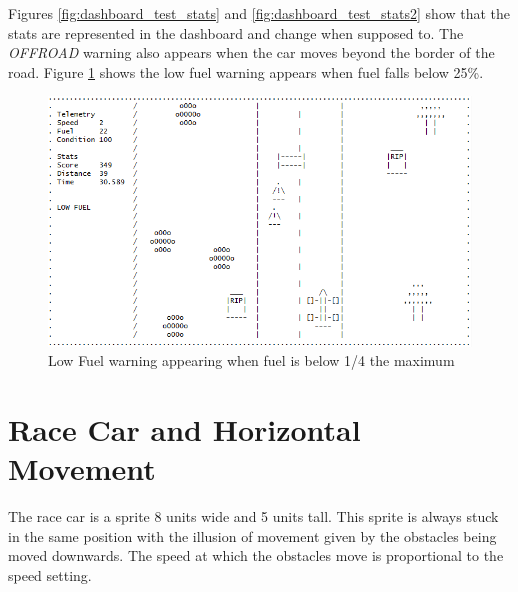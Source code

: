 \documentclass{article}
\begin{document}
Figures \ref{fig:dashboard_test_stats} and \ref{fig:dashboard_test_stats2} show that the stats are represented in the dashboard and change when supposed to. The \emph{OFFROAD} warning also appears when the car moves beyond the border of the road. 
\newline
Figure \ref{fig:dashboard_test_fuelwarning} shows the low fuel warning appears when fuel falls below 25\%.
\begin{figure}[!ht]
	\begin{center}
	\includegraphics[width=0.667\paperwidth]{images/dashboard_test_fuelwarning}
	\caption{Low Fuel warning appearing when fuel is below 1/4 the maximum}
	\label{fig:dashboard_test_fuelwarning} 
	\end{center}
\end{figure}
\clearpage

\section{Race Car and Horizontal Movement}
The race car is a sprite 8 units wide and 5 units tall. This sprite is always stuck in the same position with the illusion of movement given by the obstacles being moved downwards. The speed at which the obstacles move is proportional to the speed setting.
\end{document}
